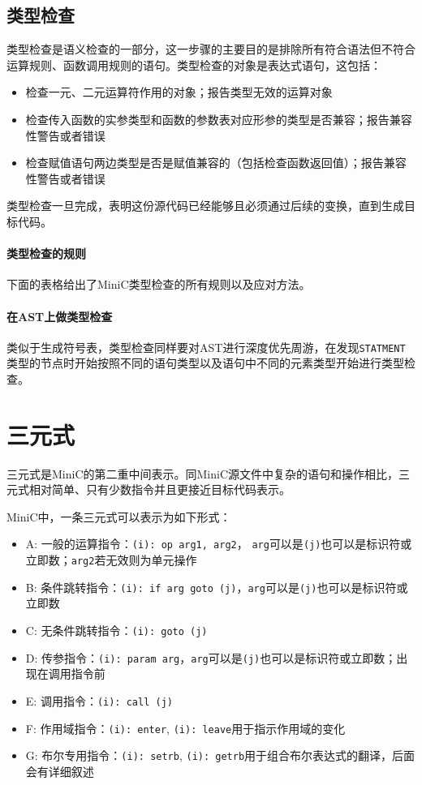 \subsection{类型检查}
\label{typeveri}
类型检查是语义检查的一部分，这一步骤的主要目的是排除所有符合语法但不符合运算规则、函数调用规则的语句。类型检查的对象是表达式语句，这包括：
\begin{itemize}
	\item 检查一元、二元运算符作用的对象；报告类型无效的运算对象
	\item 检查传入函数的实参类型和函数的参数表对应形参的类型是否兼容；报告兼容性警告或者错误
	\item 检查赋值语句两边类型是否是赋值兼容的（包括检查函数返回值）；报告兼容性警告或者错误
\end{itemize}
类型检查一旦完成，表明这份源代码已经能够且必须通过后续的变换，直到生成目标代码。
\paragraph*{类型检查的规则} 下面的表格给出了MiniC类型检查的所有规则以及应对方法。
\paragraph*{在AST上做类型检查}
类似于生成符号表，类型检查同样要对AST进行深度优先周游，在发现\verb|STATMENT|类型的节点时开始按照不同的语句类型以及语句中不同的元素类型开始进行类型检查。


\section{三元式}
\label{triple}
三元式是MiniC的第二重中间表示。同MiniC源文件中复杂的语句和操作相比，三元式相对简单、只有少数指令并且更接近目标代码表示。

MiniC中，一条三元式可以表示为如下形式：
\begin{itemize}
\item A: 一般的运算指令：\verb|(i): op arg1, arg2|， \verb|arg|可以是\verb|(j)|也可以是标识符或立即数；\verb|arg2|若无效则为单元操作
\item B: 条件跳转指令：\verb|(i): if arg goto (j)|，\verb|arg|可以是\verb|(j)|也可以是标识符或立即数
\item C: 无条件跳转指令：\verb|(i): goto (j)|
\item D: 传参指令：\verb|(i): param arg|，\verb|arg|可以是\verb|(j)|也可以是标识符或立即数；出现在调用指令前
\item E: 调用指令：\verb|(i): call (j)|
\item F: 作用域指令：\verb|(i): enter|, \verb|(i): leave|用于指示作用域的变化
\item G: 布尔专用指令：\verb|(i): setrb|, \verb|(i): getrb|用于组合布尔表达式的翻译，后面会有详细叙述
\end{itemize}

